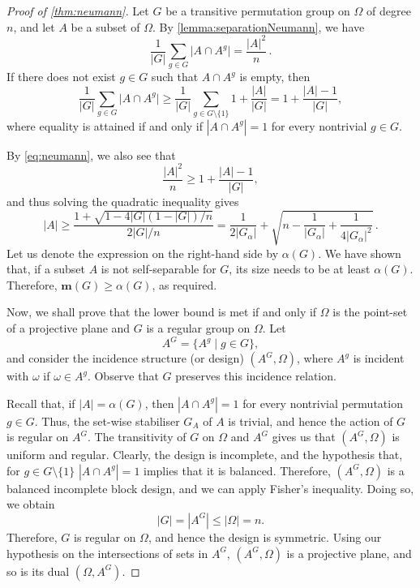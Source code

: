 \documentclass[a4paper]{amsart}
\newcommand{\m}{\mathbf{m}}
\theoremstyle{definition}
\begin{document}
\begin{proof}[Proof of \cref{thm:neumann}]
    Let $G$ be a transitive permutation group on $\Omega$ of degree $n$, and let $A$ be a subset of $\Omega$. By \cref{lemma:separationNeumann}, we have
    \begin{equation}\label{eq:neumann}
        \frac{1}{\vert G\vert}\sum_{g\in G}\vert A \cap A^g\vert =\frac{\vert A\vert ^2}{n} \,.
    \end{equation}
    If there does not exist $g\in G$ such that $A\cap A^g$ is empty, then
    \[\frac{1}{\vert G\vert}\sum_{g\in G}\vert A \cap A^g\vert \ge \frac{1}{\vert G\vert}\sum_{g\in G \setminus\{1\}} 1 + \frac{|A|}{|G|} = 1 + \frac{|A|-1}{|G|}
    ,\]
    where equality is attained if and only if $|A\cap A^g|=1$ for every nontrivial $g \in G$.
    
    By \cref{eq:neumann}, we also see that
    \[\frac{\vert A\vert ^2} {n} \geq 1 + \frac{|A|-1}{|G|}, \]
    and thus solving the quadratic inequality gives
    \[\vert A\vert \geq \frac{1 + \sqrt{1 - 4|G|(1-|G|)/n}}{2|G|/n} = \frac{1}{2|G_\alpha|} + \sqrt{n - \frac{1}{|G_\alpha|} + \frac{1}{4|G_\alpha|^2}}\, .\]
    Let us denote the expression on the right-hand side  by $\alpha(G)$. We have shown that, if a subset $A$ is not self-separable for $G$, its size needs to be at least $\alpha(G)$. Therefore, $\m(G) \ge \alpha(G)$, as required.

    Now, we shall prove that the lower bound is met if and only if $\Omega$ is the point-set of a projective plane and $G$ is a regular group on $\Omega$. Let 
    \[ A^G = \{ A^g \mid g \in G\},\]
    and consider the incidence structure (or design) $(A^G, \Omega)$, where $A^g$ is incident with $\omega$ if $\omega \in A^g$. Observe that $G$ preserves this incidence relation.
    
    Recall that, if $|A|=\alpha(G)$, then $|A\cap A^g|=1$ for every nontrivial permutation $g \in G$. Thus, the set-wise stabiliser $G_A$ of $A$ is trivial, and hence the action of $G$ is regular on $A^G$. The transitivity of $G$ on $\Omega$ and $A^G$ gives us that $(A^G, \Omega)$ is uniform and regular. Clearly, the design is incomplete, and the hypothesis that, for $g\in G \setminus \{1\}$ $|A\cap A^g|=1$ implies that it is balanced. Therefore, $(A^G, \Omega)$ is a balanced incomplete block design, and we can apply Fisher's inequality. Doing so, we obtain
    \[ |G| = |A^G| \le |\Omega| = n .\]
    Therefore, $G$ is regular on $\Omega$, and hence the design is symmetric. Using our hypothesis on the intersections of sets in $A^G$, $(A^G, \Omega)$ is a projective plane, and so is its dual $(\Omega,A^G)$.
\end{proof}
\end{document}
